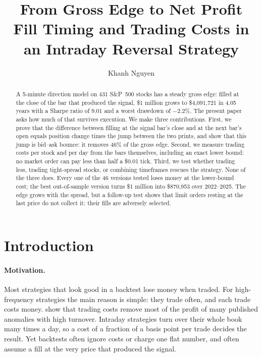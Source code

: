 \documentclass[11pt,a4paper]{article}
\title{\textbf{From Gross Edge to Net Profit}\\[0.4em]
\large Fill Timing and Trading Costs in an Intraday Reversal Strategy}
\author{Khanh Nguyen}
\date{}
\begin{document}
\maketitle

\begin{abstract}
\noindent A 5-minute direction model on 431 S\&P~500 stocks has a steady gross edge: filled at the
close of the bar that produced the signal, \$1 million grows to \$4{,}091{,}721 in 4.05 years with a
Sharpe ratio of $9.01$ and a worst drawdown of $-2.2\%$. The present paper asks how much of that survives
execution. We make three contributions. First, we prove that the difference between filling at the
signal bar's close and at the next bar's open equals position change times the jump between the two
prints, and show that this jump is bid--ask bounce: it removes $46\%$ of the gross edge. Second, we
measure trading costs per stock and per day from the bars themselves, including an exact lower bound: no
market order can pay less than half a \$0.01 tick. Third, we test whether trading less, trading
tight-spread stocks, or combining timeframes rescues the strategy. None of the three does. Every one of the
46 versions tested loses money at the lower-bound cost; the best out-of-sample version turns \$1
million into \$870{,}953 over 2022--2025. The edge grows with the spread, but a follow-up test shows that
limit orders resting at the last price do not collect it: their fills are adversely selected.
\end{abstract}

\section{Introduction}
\label{sec:intro}

\paragraph{Motivation.} Most strategies that look good in a backtest lose money when traded. For
high-frequency strategies the main reason is simple: they trade often, and each trade costs money.
\citet{novymarx2016} show that trading costs remove most of the profit of many published anomalies with
high turnover. Intraday strategies turn over their whole book many times a day, so a cost of a fraction
of a basis point per trade decides the result. Yet backtests often ignore costs or charge one flat
number, and often assume a fill at the very price that produced the signal.
\end{document}
